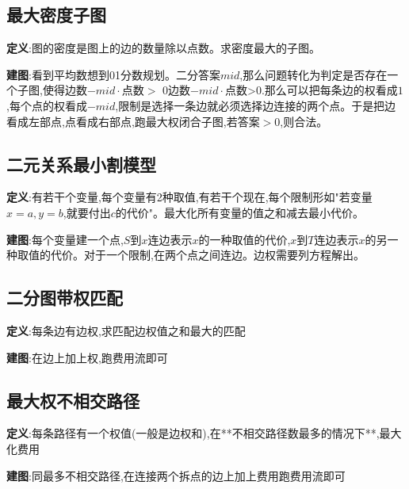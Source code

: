 \documentclass[12pt, a4paper, oneside]{ctexart}
\begin{document}
\subsection{最大密度子图}
\textbf{定义}:图的密度是图上的边的数量除以点数。求密度最大的子图。\par
\textbf{建图}:看到平均数想到01分数规划。二分答案$mid$,那么问题转化为判定是否存在一个子图,使得边数−$mid\cdot$点数$>$ $0$边数−$mid \cdot$点数>$0$.那么可以把每条边的权看成$1$,每个点的权看成$−mid$,限制是选择一条边就必须选择边连接的两个点。于是把边看成左部点,点看成右部点,跑最大权闭合子图,若答案$>0$,则合法。


\subsection{二元关系最小割模型}
\textbf{定义}:有若干个变量,每个变量有2种取值,有若干个现在,每个限制形如"若变量$x=a,y=b$,就要付出$c$的代价"。最大化所有变量的值之和减去最小代价。\par
\textbf{建图}:每个变量建一个点,$S$到$x$连边表示$x$的一种取值的代价,$x$到$T$连边表示$x$的另一种取值的代价。对于一个限制,在两个点之间连边。边权需要列方程解出。


\subsection{二分图带权匹配}
\textbf{定义}:每条边有边权,求匹配边权值之和最大的匹配\par
\textbf{建图}:在边上加上权,跑费用流即可


\subsection{最大权不相交路径}
\textbf{定义}:每条路径有一个权值(一般是边权和),在**不相交路径数最多的情况下**,最大化费用\par
\textbf{建图}:同最多不相交路径,在连接两个拆点的边上加上费用跑费用流即可
\end{document}
